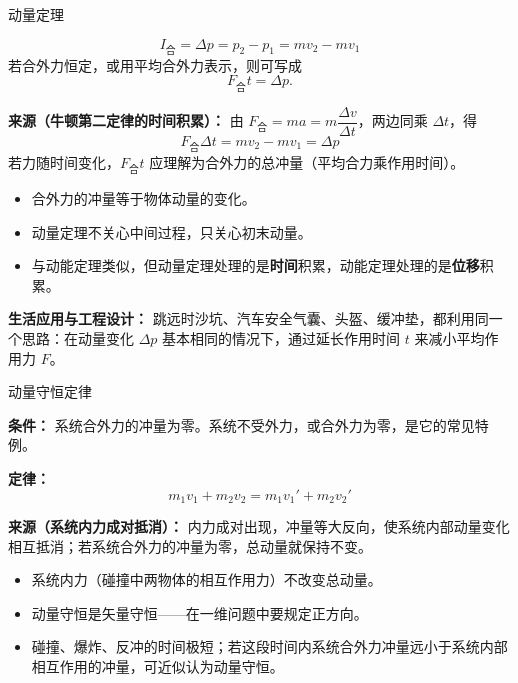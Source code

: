 \begin{conceptbox}{动量定理}

\[
\boxed{I_{\text{合}}=\Delta p = p_2 - p_1 = mv_2 - mv_1}
\]
若合外力恒定，或用平均合外力表示，则可写成
\[
F_{\text{合}}t=\Delta p.
\]

\textbf{来源（牛顿第二定律的时间积累）：}
由 $F_{\text{合}}=ma=m\dfrac{\Delta v}{\Delta t}$，两边同乘 $\Delta t$，得
\[
F_{\text{合}}\Delta t = m v_2 - m v_1 = \Delta p
\]
若力随时间变化，$F_{\text{合}}t$ 应理解为合外力的总冲量（平均合力乘作用时间）。

\begin{itemize}
  \item 合外力的冲量等于物体动量的变化。
  \item 动量定理不关心中间过程，只关心初末动量。
  \item 与动能定理类似，但动量定理处理的是\textbf{时间}积累，动能定理处理的是\textbf{位移}积累。
\end{itemize}

\textbf{生活应用与工程设计：} 跳远时沙坑、汽车安全气囊、头盔、缓冲垫，都利用同一个思路：在动量变化 $\Delta p$ 基本相同的情况下，通过延长作用时间 $t$ 来减小平均作用力 $F$。

\begin{center}
\begin{minipage}{0.86\textwidth}
\centering


\label{fig:impulse-buffer}
\end{minipage}
\end{center}

\end{conceptbox}

\begin{conceptbox}{动量守恒定律}

\textbf{条件：} 系统合外力的冲量为零。系统不受外力，或合外力为零，是它的常见特例。

\textbf{定律：}
\[
\boxed{m_1 v_1 + m_2 v_2 = m_1 v_1' + m_2 v_2'}
\]

\textbf{来源（系统内力成对抵消）：}
内力成对出现，冲量等大反向，使系统内部动量变化相互抵消；若系统合外力的冲量为零，总动量就保持不变。

\begin{itemize}
  \item 系统内力（碰撞中两物体的相互作用力）不改变总动量。
  \item 动量守恒是矢量守恒——在一维问题中要规定正方向。
  \item 碰撞、爆炸、反冲的时间极短；若这段时间内系统合外力冲量远小于系统内部相互作用的冲量，可近似认为动量守恒。
\end{itemize}

\begin{center}


\label{fig:collision-model}
\end{center}

\end{conceptbox}

